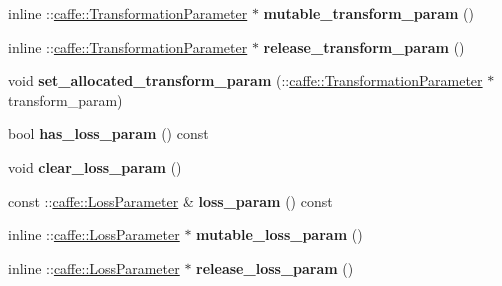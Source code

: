 \begin{DoxyCompactItemize}
\item 
\mbox{\label{classcaffe_1_1_layer_parameter_a8c5a7967112f9b394d24f4a0acbd0881}} 
inline \+::\mbox{\hyperlink{classcaffe_1_1_transformation_parameter}{caffe\+::\+Transformation\+Parameter}} $\ast$ {\bfseries mutable\+\_\+transform\+\_\+param} ()
\item 
\mbox{\label{classcaffe_1_1_layer_parameter_a8b7b737d42af0ae8c23f8a0fd35cbc86}} 
inline \+::\mbox{\hyperlink{classcaffe_1_1_transformation_parameter}{caffe\+::\+Transformation\+Parameter}} $\ast$ {\bfseries release\+\_\+transform\+\_\+param} ()
\item 
\mbox{\label{classcaffe_1_1_layer_parameter_ae2e0a6e639de935a350b851949bd673a}} 
void {\bfseries set\+\_\+allocated\+\_\+transform\+\_\+param} (\+::\mbox{\hyperlink{classcaffe_1_1_transformation_parameter}{caffe\+::\+Transformation\+Parameter}} $\ast$transform\+\_\+param)
\item 
\mbox{\label{classcaffe_1_1_layer_parameter_a92bc8c87be29b7bdcc3921218297c7da}} 
bool {\bfseries has\+\_\+loss\+\_\+param} () const
\item 
\mbox{\label{classcaffe_1_1_layer_parameter_a113065208714f427f0ee0957c02ce8c5}} 
void {\bfseries clear\+\_\+loss\+\_\+param} ()
\item 
\mbox{\label{classcaffe_1_1_layer_parameter_a6ede5a4497543d132956025f64f8615c}} 
const \+::\mbox{\hyperlink{classcaffe_1_1_loss_parameter}{caffe\+::\+Loss\+Parameter}} \& {\bfseries loss\+\_\+param} () const
\item 
\mbox{\label{classcaffe_1_1_layer_parameter_a0facbc546b7389afbf8e13c737b9ff4b}} 
inline \+::\mbox{\hyperlink{classcaffe_1_1_loss_parameter}{caffe\+::\+Loss\+Parameter}} $\ast$ {\bfseries mutable\+\_\+loss\+\_\+param} ()
\item 
\mbox{\label{classcaffe_1_1_layer_parameter_a3582b6ee9931d3c3d2e3d7bd7be7f793}} 
inline \+::\mbox{\hyperlink{classcaffe_1_1_loss_parameter}{caffe\+::\+Loss\+Parameter}} $\ast$ {\bfseries release\+\_\+loss\+\_\+param} ()

\end{DoxyCompactItemize}
